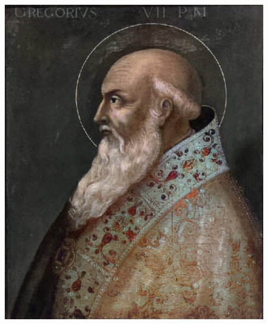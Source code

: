 \documentclass{article}
\begin{document}
\noindent\begin{minipage}{0.3\textwidth}
    \includegraphics[width=\linewidth]{rehor_vii.png}
\end{minipage}
\end{document}
